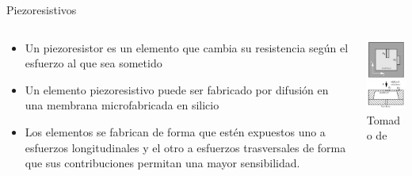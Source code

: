 \documentclass[aspectratio=169]{beamer}
\begin{document}
\begin{frame}{Piezoresistivos}
    \begin{columns}[c, onlytextwidth]
        \begin{column}{0.65\textwidth}
            \begin{itemize}
                \item Un piezoresistor es un elemento que cambia su resistencia según el esfuerzo al que sea sometido
                \item Un elemento piezoresistivo puede ser fabricado por difusión en una membrana microfabricada en silicio
                \item Los elementos se fabrican de forma que estén expuestos uno a esfuerzos longitudinales y el otro a esfuerzos trasversales de forma que sus contribuciones permitan una mayor sensibilidad. 
            \end{itemize}
        \end{column}
        \begin{column}{0.3\textwidth}
            \centering
            \includegraphics[width=3.5cm]{fig/Presion/piezores.PNG}
             \\ \tiny{Tomado de \cite{pallas2012sensors}}
        \end{column}
    \end{columns}
\end{frame}
\end{document}
